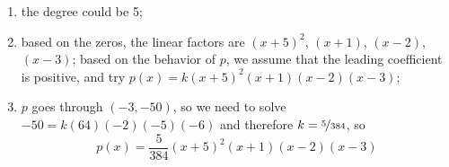 \begin{problem}
\begin{shortsolution}
\begin{enumerate}
            \item the degree could be 5;
            \item based on the zeros, the linear factors are $(x+5)^2$, $(x+1)$, $(x-2)$, $(x-3)$;
            based on the behavior of $p$, we assume that the leading coefficient is positive, and try $p(x)=k(x+5)^2(x+1)(x-2)(x-3)$;
            \item $p$ goes through $(-3,-50)$, so we need to solve $-50=k(64)(-2)(-5)(-6)$ and therefore $k=\nicefrac{5}{384}$, so
            \[
                p(x)=\frac{5}{384}(x+5)^2(x+1)(x-2)(x-3)
            \]
        \end{enumerate}
    \end{shortsolution}
\end{problem}


\begin{figure}[!htb]
\setlength{\figurewidth}{0.3\textwidth}
    \begin{subfigure}{\figurewidth}
            \caption{}
            \label{poly:fig:findformdeg2}
    \end{subfigure}
    \hfill
    \begin{subfigure}{\figurewidth}
            \caption{}
            \label{poly:fig:findformdeg3}
    \end{subfigure}
    \hfill
    \begin{subfigure}{\figurewidth}

\end{subfigure}
\end{figure}
